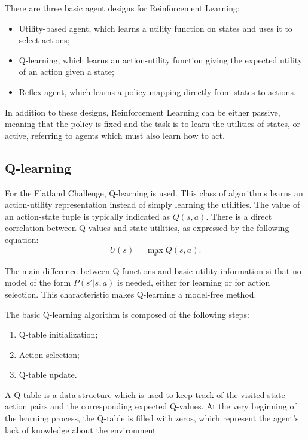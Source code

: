 \documentclass[a4paper, 12pt]{article}
\numberwithin{equation}{section}
\begin{document}
There are three basic agent designs for Reinforcement Learning:
\begin{itemize}
	\item Utility-based agent, which learns a utility function on states and uses it to select actions;
	\item Q-learning, which learns an action-utility function giving the expected utility of an action given a state;
	\item Reflex agent, which learns a policy mapping directly from states to actions.
\end{itemize}

In addition to these designs, Reinforcement Learning can be either passive, meaning that the policy is fixed and the task is to learn the utilities of states, or active, referring to agents which must also learn how to act.

\subsection[Q-learning]{Q-learning \cite{dqn-tutorial}}

For the Flatland Challenge, Q-learning is used. This class of algorithms learns an action-utility representation instead of simply learning the utilities. The value of an action-state tuple is typically indicated as $Q\left(s,a\right)$. There is a direct correlation between Q-values and state utilities, as expressed by the following equation:
\begin{equation}
	U\left(s\right) = \max_a Q\left(s,a\right).
\end{equation}

The main difference between Q-functions and basic utility information si that no model of the form $P\left(s'|s,a\right)$ is needed, either for learning or for action selection. This characteristic makes Q-learning a model-free method.

The basic Q-learning algorithm is composed of the following steps:
\begin{enumerate}
	\item Q-table initialization;
	\item Action selection;
	\item Q-table update.
\end{enumerate}


A Q-table is a data structure which is used to keep track of the visited state-action pairs and the corresponding expected Q-values. At the very beginning of the learning process, the Q-table is filled with zeros, which represent the agent's lack of knowledge about the environment.
\end{document}
